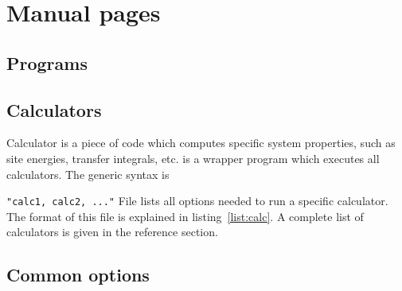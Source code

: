 \chapter{Manual pages}
%
%
\section{Programs}
\label{ref:programs}


\section{Calculators}
\label{ref:calculators}
\label{sec:calculators}

Calculator is a piece of code which computes specific system properties, such as site energies, transfer integrals, etc. \ctprun is a wrapper program which executes all calculators. The generic syntax is 

  \ctprun \exe \texttt{"calc1, calc2, ..."} \opt \xmloptions
\vskip 0.2cm
%
File \xmloptions lists all options needed to run a specific calculator. The format of this file is explained in listing~\ref{list:calc}. A complete list of calculators is given in the  reference section.
%



\vfill

\section{Common options}
\label{ref:options}
{\small 

}
\vfill
